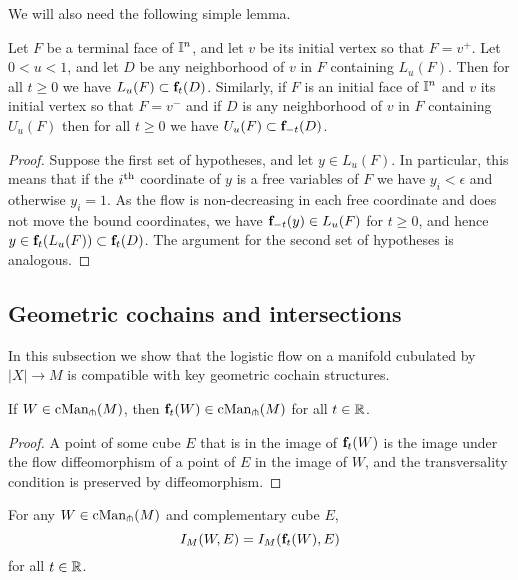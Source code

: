 We will also need the following simple lemma.

\begin{lemma}\label{L: domain flow}
	Let $F$ be a terminal face of $\mathbb{I}^n$, and let $v$ be its initial vertex so that $F=v^+$. Let $0<u<1$, and let $D$ be any neighborhood of $v$ in $F$ containing $L_u(F)$. Then for all $t\geq 0$ we have $L_u(F)\subset \mathbf{f}_t(D)$. Similarly, if $F$ is an initial face of $\mathbb{I}^n$ and $v$ its initial vertex so that $F=v^-$ and if $D$ is any neighborhood of $v$ in $F$ containing $U_u(F)$ then for all $t\geq 0$ we have $U_u(F)\subset \mathbf{f}_{-t}(D)$.
\end{lemma}

\begin{proof}
	Suppose the first set of hypotheses, and let $y\in L_u(F)$. In particular, this means that if the $i^{\mathrm{th}}$ coordinate of $y$ is a free variables of $F$ we have $y_i<\epsilon$ and otherwise $y_i=1$. As the flow is non-decreasing in each free coordinate and does not move the bound coordinates, we have $\mathbf{f}_{-t}(y)\in L_u(F)$ for $t\geq 0$, and hence $y\in \mathbf{f}_t(L_u(F))\subset \mathbf{f}_t(D)$. The argument for the second set of hypotheses is analogous.
\end{proof}

\subsection{Geometric cochains and intersections}

In this subsection we show that the logistic flow on a manifold cubulated by $|X| \to M$ is compatible with key geometric cochain structures.

\begin{lemma}\label{l:flow preserves transversality}
	If $W \in \mathrm{cMan}_{\pitchfork}(M)$, then $\mathbf{f}_t(W)\in \mathrm{cMan}_{\pitchfork}(M)$ for all $t \in \mathbb{R}$.
\end{lemma}

\begin{proof}
	A point of some cube $E$ that is in the image of $\mathbf{f}_t(W)$ is the image under the flow diffeomorphism of a point of $E$ in the image of $W$, and the transversality condition is preserved by diffeomorphism.
\end{proof}

\begin{lemma}
	For any $W \in \mathrm{cMan}_{\pitchfork}(M)$ and complementary cube $E$,
	\begin{equation*}
		I_M(W, E) = I_M(\mathbf{f}_t(W), E)
	\end{equation*}
	for all $t \in \mathbb{R}$.
\end{lemma}

